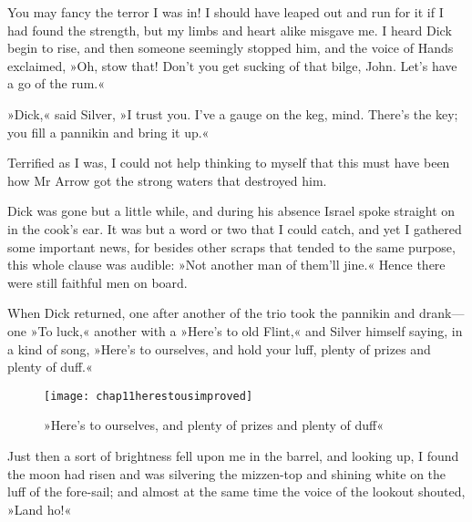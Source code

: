 You may fancy the terror I was in! I should have leaped out and run for it if I had found the strength, but my limbs and heart alike misgave me. I heard Dick begin to rise, and then someone seemingly stopped him, and the voice of Hands exclaimed, »Oh, stow that! Don't you get sucking of that bilge, John. Let's have a go of the rum.«

»Dick,« said Silver, »I trust you. I've a gauge on the keg, mind. There's the key; you fill a pannikin and bring it up.«

Terrified as I was, I could not help thinking to myself that this must have been how Mr Arrow got the strong waters that destroyed him.

Dick was gone but a little while, and during his absence Israel spoke straight on in the cook's ear. It was but a word or two that I could catch, and yet I gathered some important news, for besides other scraps that tended to the same purpose, this whole clause was audible: »Not another man of them'll jine.« Hence there were still faithful men on board.

When Dick returned, one after another of the trio took the pannikin and drank—one »To luck,« another with a »Here's to old Flint,« and Silver himself saying, in a kind of song, »Here's to ourselves, and hold your luff, plenty of prizes and plenty of duff.«

 \begin{figure}[p]
\centering
\texttt{[image: chap11herestousimproved]}
\caption[»Here's to ourselves«]{»Here's to ourselves, and plenty of prizes and plenty of duff«}
\end{figure}

Just then a sort of brightness fell upon me in the barrel, and looking up, I found the moon had risen and was silvering the mizzen-top and shining white on the luff of the fore-sail; and almost at the same time the voice of the lookout shouted, »Land ho!«
